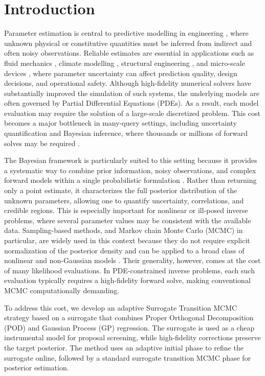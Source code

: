 \documentclass{elsarticle}
\begin{document}
\section{Introduction}

Parameter estimation is central to predictive modelling in engineering \cite{BK19}, where unknown physical or constitutive quantities must be inferred from indirect and often noisy observations. Reliable estimates are essential in applications such as fluid mechanics  \cite{CDRS09}, climate modelling \cite{SLST17}, structural engineering \cite{GR22}, and micro-scale devices \cite{ZRGFM24}, where parameter uncertainty can affect prediction quality, design decisions, and operational safety. Although high-fidelity numerical solvers have substantially improved the simulation of such systems, the underlying models are often governed by Partial Differential Equations (PDEs). As a result, each model evaluation may require the solution of a large-scale discretized problem. This cost becomes a major bottleneck in many-query settings, including uncertainty quantification and Bayesian inference, where thousands or millions of forward solves may be required \cite{S15,S10}.

The Bayesian framework is particularly suited to this setting because it provides a systematic way to combine prior information, noisy observations, and complex forward models within a single probabilistic formulation \cite{T05, KS05, S24}. Rather than returning only a point estimate, it characterizes the full posterior distribution of the unknown parameters, allowing one to quantify uncertainty, correlations, and credible regions. This is especially important for nonlinear or ill-posed inverse problems, where several parameter values may be consistent with the available data. Sampling-based methods, and Markov chain Monte Carlo (MCMC) in particular, are widely used in this context because they do not require explicit normalization of the posterior density and can be applied to a broad class of nonlinear and non-Gaussian models \cite{RC04}. Their generality, however, comes at the cost of many likelihood evaluations. In PDE-constrained inverse problems, each such evaluation typically requires a high-fidelity forward solve, making conventional MCMC computationally demanding.

To address this cost, we develop an adaptive Surrogate Transition  MCMC strategy based on a surrogate that combines Proper Orthogonal Decomposition (POD) and Gaussian Process (GP) regression. The surrogate is used as a cheap instrumental model for proposal screening, while high-fidelity corrections preserve the target posterior. The method uses an adaptive initial phase to refine the surrogate online, followed by a standard surrogate transition MCMC phase for posterior estimation.
\end{document}
